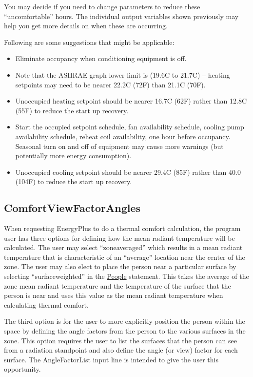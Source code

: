 You may decide if you need to change parameters to reduce these ``uncomfortable'' hours. The individual output variables shown previously may help you get more details on when these are occurring.

Following are some suggestions that might be applicable:

\begin{itemize}
\item
  Eliminate occupancy when conditioning equipment is off.
\item
  Note that the ASHRAE graph lower limit is (19.6C to 21.7C) -- heating setpoints may need to be nearer 22.2C (72F) than 21.1C (70F).
\item
  Unoccupied heating setpoint should be nearer 16.7C (62F) rather than 12.8C (55F) to reduce the start up recovery.
\item
  Start the occupied setpoint schedule, fan availability schedule, cooling pump availability schedule, reheat coil availability, one hour before occupancy. Seasonal turn on and off of equipment may cause more warnings (but potentially more energy consumption).
\item
  Unoccupied cooling setpoint should be nearer 29.4C (85F) rather than 40.0 (104F) to reduce the start up recovery.
\end{itemize}

\subsection{ComfortViewFactorAngles}\label{comfortviewfactorangles}

When requesting EnergyPlus to do a thermal comfort calculation, the program user has three options for defining how the mean radiant temperature will be calculated. The user may select ``zoneaveraged'' which results in a mean radiant temperature that is characteristic of an ``average'' location near the center of the zone. The user may also elect to place the person near a particular surface by selecting ``surfaceweighted'' in the \hyperref[people]{People} statement. This takes the average of the zone mean radiant temperature and the temperature of the surface that the person is near and uses this value as the mean radiant temperature when calculating thermal comfort.

The third option is for the user to more explicitly position the person within the space by defining the angle factors from the person to the various surfaces in the zone. This option requires the user to list the surfaces that the person can see from a radiation standpoint and also define the angle (or view) factor for each surface. The AngleFactorList input line is intended to give the user this opportunity.

